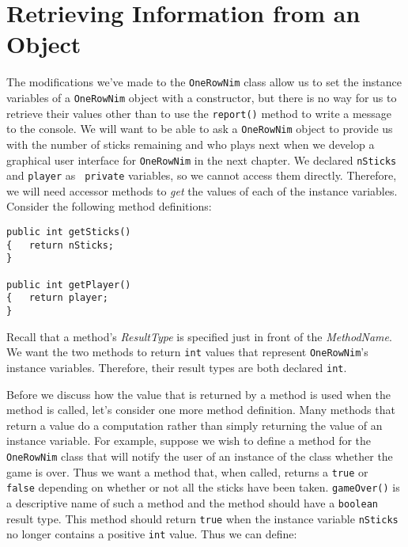 
\section{Retrieving Information from an Object}
\label{retrieving-informationfroman-object}

\noindent The modifications we've made to the {\tt OneRowNim} class
allow us to set the instance variables of a {\tt OneRowNim} object
with a constructor, but there is no way for us to retrieve their
values other than to use the {\tt report()} method to write a message
to the console. We will want to be able to ask a {\tt OneRowNim}
object to provide us with the number of sticks remaining and who plays
next when we develop a graphical user interface for {\tt OneRowNim} in
the next chapter.  We declared {\tt nSticks} and {\tt player} as {\tt
private} variables, so we cannot access them directly.  Therefore, we
will need accessor methods to {\it get} the values of each of the
instance variables.  Consider the following method definitions:

\begin{jjjlisting}
\begin{lstlisting}
public int getSticks()
{   return nSticks;
}

public int getPlayer()
{   return player;
}
\end{lstlisting}
\end{jjjlisting}

\noindent Recall that a method's {\it ResultType} is specified just
in front of the {\it MethodName}. We want the two methods to return
{\tt int} values that represent {\tt OneRowNim}'s instance
variables. Therefore, their result types are both declared {\tt int}.

Before we discuss how the value that is returned by a method is used
when the method is called, let's consider one more method definition.
Many methods that return a value do a computation rather than simply
returning the value of an instance variable.  For example, suppose we
wish to define a method for the {\tt OneRowNim} class that will notify
the user of an instance of the class whether the game is over.  Thus
we want a method that, when called, returns a {\tt true} or {\tt
false} depending on whether or not all the sticks have been taken.
{\tt gameOver()} is a descriptive name of such a method and the method
should have a {\tt boolean} result type.  This method should return
{\tt true} when the instance variable {\tt nSticks} no longer contains
a positive {\tt int} value.  Thus we can define:

